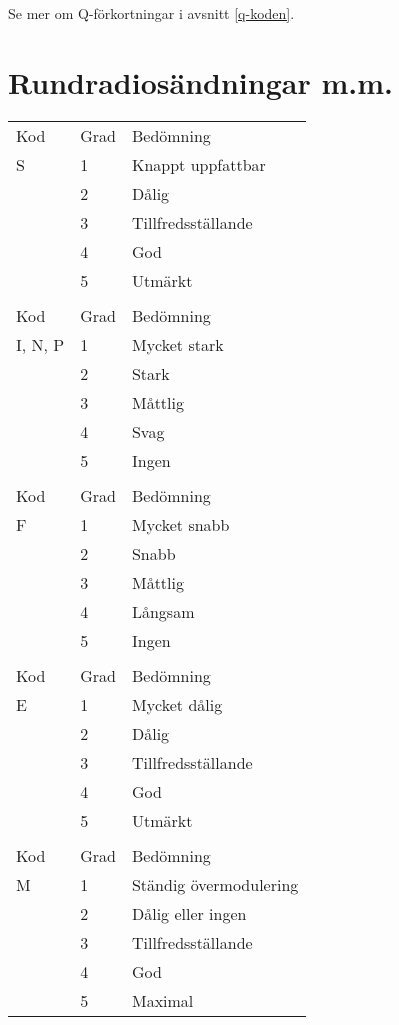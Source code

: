 Se mer om Q-förkortningar i avsnitt \ref{q-koden}.

\section{Rundradiosändningar m.m.}
\label{sinpo}

\begin{table}[h]
  \begin{center}
\begin{tabular}{lll}
  Kod & Grad & Bedömning \\
  S   & 1    & Knappt uppfattbar \\
      & 2    & Dålig \\
      & 3    & Tillfredsställande \\
      & 4    & God \\
      & 5    & Utmärkt \\
  & & \\

  Kod     & Grad & Bedömning \\
  I, N, P & 1    & Mycket stark \\
          & 2    & Stark \\
          & 3    & Måttlig \\
          & 4    & Svag \\
          & 5    & Ingen \\
  & & \\

  Kod & Grad & Bedömning \\
  F   & 1    & Mycket snabb \\
      & 2    & Snabb \\
      & 3    & Måttlig \\
      & 4    & Långsam \\
      & 5    & Ingen \\

  & & \\
  Kod & Grad & Bedömning \\
  E   & 1    & Mycket dålig \\
      & 2    & Dålig \\
      & 3    & Tillfredsställande \\
      & 4    & God \\
      & 5    & Utmärkt \\

  & & \\
  Kod & Grad & Bedömning \\
  M   & 1    & Ständig övermodulering \\
      & 2    & Dålig eller ingen \\
      & 3    & Tillfredsställande \\
      & 4    & God \\
      & 5    & Maximal \\


\end{tabular}
\end{center}
\end{table}
